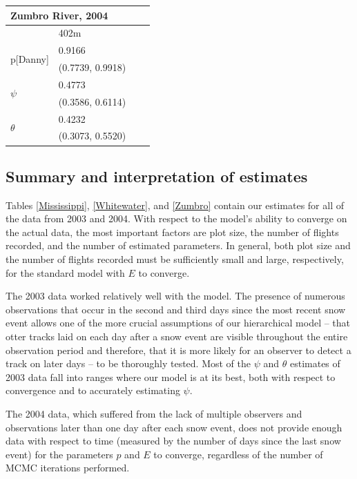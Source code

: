 \documentclass[12pt]{article}
\begin{document}
\begin{table}
    \begin{center}
    \begin{tabular}{|l|l|l|l|}
        \hline
        \multicolumn{2}{|l|}{\textbf{Zumbro River, 2004}} \\
        \hline
            & 402m \\
        \hline
        \multirow{2}{*}{p[Danny]}
            & 0.9166 \\
            & (0.7739, 0.9918) \\
        \hline
        \multirow{2}{*}{\(\psi\)}
            & 0.4773 \\
            & (0.3586, 0.6114) \\
        \hline
        \multirow{2}{*}{\(\theta\)}
            & 0.4232 \\
            & (0.3073, 0.5520) \\
        \hline
    \end{tabular}
    \end{center}
    \end{table}

    \subsection{Summary and interpretation of estimates}
    Tables \ref{Mississippi}, \ref{Whitewater}, and \ref{Zumbro} contain our
    estimates for all of the data from
    2003 and 2004.
    With respect to the model's ability to converge on the actual data, the most
    important factors are plot size, the number of flights recorded, and the
    number of estimated parameters. In general, both plot size and the number of
    flights recorded must be sufficiently small and large, respectively, for the
    standard model with \(E\) to converge.

    The 2003 data worked relatively well with the model. The presence of
    numerous
    observations that occur in the second and third days since the most recent
    snow event allows one of the more crucial assumptions of our hierarchical
    model -- that otter tracks laid on each day after a snow event are visible
    throughout the entire observation period and therefore, that it is more
    likely for an observer to detect a track on later days -- to be thoroughly
    tested. Most of the \(\psi\) and \(\theta\) estimates of 2003 data fall
    into ranges where our model is at its best, both with respect to convergence
    and to accurately estimating \(\psi\).

    The 2004 data, which suffered from the lack of multiple observers and
    observations later than one day after each snow event, does not provide
    enough data with respect to time (measured by the number of days since the
    last snow event) for the parameters \(p\) and \(E\) to converge, regardless
    of the number of MCMC iterations performed.
\end{document}
